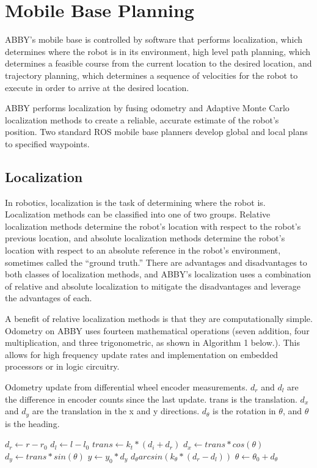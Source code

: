 \documentclass[]{cwru} %
\begin{document}
\section{Mobile Base Planning}


ABBY's mobile base is controlled by software that performs localization,
which determines where the robot is in its environment, high level path
planning, which determines a feasible course from the current location
to the desired location, and trajectory planning, which determines a
sequence of velocities for the robot to execute in order to arrive at
the desired location.

ABBY performs localization by fusing odometry and Adaptive Monte Carlo
localization methods to create a reliable, accurate estimate of the
robot's position. Two standard ROS mobile base planners develop global
and local plans to specified
waypoints.

\subsection{Localization}
\label{localization}

In robotics, localization is the task of determining where the robot is.
Localization methods can be classified into one of two groups. Relative
localization methods determine the robot's location with respect to the
robot's previous location, and absolute localization methods determine
the robot's location with respect to an absolute reference in the
robot's environment, sometimes called the ``ground truth.'' There are
advantages and disadvantages to both classes of localization methods,
and ABBY's localization uses a combination of relative and absolute
localization to mitigate the disadvantages and leverage the advantages
of each.

A benefit of relative localization methods is that they are
computationally simple. Odometry on ABBY uses fourteen mathematical
operations (seven addition, four multiplication, and three
trigonometric, as shown in Algorithm 1 below.). This allows for high
frequency update rates and implementation on embedded processors or in
logic circuitry.

\begin{algorithm}
\caption{Odometry update from differential wheel encoder measurements. 
$d_r$ and $d_l$ are the difference in encoder counts since the last update. trans 
is the translation. $d_x$ and $d_y$ are the translation in the x and y directions. 
$d_{\theta}$ is the rotation in $\theta$, and $\theta$ is the heading.}
\label{alg1}
\begin{algorithmic}
\STATE $d_r \gets r - r_0$
\STATE $d_l \gets l - l_0$
\STATE $trans \gets k_t * (d_i + d_r)$
\STATE $d_x \gets trans * cos(\theta)$
\STATE $d_y \gets trans * sin(\theta)$
\STATE $y \gets y_0 * d_y$
\STATE $d_\theta arcsin(k_\theta * (d_r - d_l))$
\STATE $\theta \gets \theta_0 + d_\theta$
\end{algorithmic}
\end{algorithm}
\end{document}

